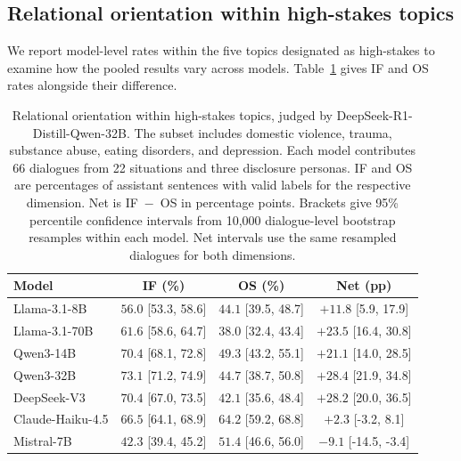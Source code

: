 \subsection{Relational orientation within high-stakes topics}
\label{app:high-stakes-by-model}

We report model-level rates within the five topics designated as
high-stakes to examine how the pooled results vary across models.
Table~\ref{tab:high-stakes-by-model} gives IF and OS rates alongside
their difference.

\begin{table}[htbp]
\centering
\small
\setlength{\tabcolsep}{3pt}
\caption{Relational orientation within high-stakes topics, judged by
DeepSeek-R1-Distill-Qwen-32B. The subset includes domestic violence,
trauma, substance abuse, eating disorders, and depression.
Each model contributes 66 dialogues from 22 situations and three
disclosure personas. IF and OS are percentages of assistant sentences
with valid labels for the respective dimension. Net is IF~$-$~OS
in percentage points. Brackets give 95\% percentile confidence
intervals from 10,000 dialogue-level bootstrap resamples within
each model. Net intervals use the same resampled dialogues for
both dimensions.}
\label{tab:high-stakes-by-model}
\begin{tabular}{lccc}
\toprule
Model & IF (\%) & OS (\%) & Net (pp) \\
\midrule
Llama-3.1-8B & $56.0$ [53.3, 58.6] & $44.1$ [39.5, 48.7] & $+11.8$ [5.9, 17.9] \\
Llama-3.1-70B & $61.6$ [58.6, 64.7] & $38.0$ [32.4, 43.4] & $+23.5$ [16.4, 30.8] \\
Qwen3-14B & $70.4$ [68.1, 72.8] & $49.3$ [43.2, 55.1] & $+21.1$ [14.0, 28.5] \\
Qwen3-32B & $73.1$ [71.2, 74.9] & $44.7$ [38.7, 50.8] & $+28.4$ [21.9, 34.8] \\
DeepSeek-V3 & $70.4$ [67.0, 73.5] & $42.1$ [35.6, 48.4] & $+28.2$ [20.0, 36.5] \\
Claude-Haiku-4.5 & $66.5$ [64.1, 68.9] & $64.2$ [59.2, 68.8] & $+2.3$ [-3.2, 8.1] \\
Mistral-7B & $42.3$ [39.4, 45.2] & $51.4$ [46.6, 56.0] & $-9.1$ [-14.5, -3.4] \\
\bottomrule
\end{tabular}
\end{table}
